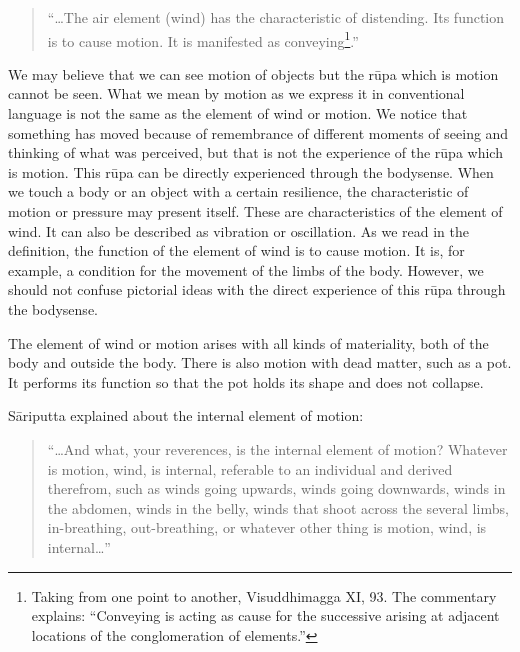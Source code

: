 \documentclass{book}
\begin{document}
\begin{quote}\begin{flushleft}
``\ldots The air element (wind) has the characteristic of distending. Its
function is to cause motion. It is manifested as
conveying\footnote{Taking from one point to another, Visuddhimagga
XI, 93. The commentary explains: ``Conveying is acting as cause for the
successive arising at adjacent locations of the conglomeration of
elements.''}.''
\end{flushleft}\end{quote}




We may believe that we can see motion of objects but the r\=upa which is
motion cannot be seen. What we mean by motion as we express it in
conventional language is not the same as the element of wind or motion.
We notice that something has moved because of remembrance of different
moments of seeing and thinking of what was perceived, but that is not
the experience of the r\=upa which is motion. This r\=upa can be
directly experienced through the bodysense. When we touch a body or an
object with a certain resilience, the characteristic of motion or
pressure may present itself. These are characteristics of the element
of wind. It can also be described as vibration or oscillation. As we
read in the definition, the function of the element of wind is to cause
motion. It is, for example, a condition for the movement of the limbs
of the body. However, we should not confuse pictorial ideas with the
direct experience of this r\=upa through the bodysense. 

The element of wind or motion arises with all kinds of materiality, both
of the body and outside the body. There is also motion with dead
matter, such as a pot. It performs its function so that the pot holds
its shape and does not collapse.

S{\=a}riputta explained about the internal element of motion:




\begin{quote}\begin{flushleft}
``\ldots And what, your reverences, is the internal element of motion?
Whatever is motion, wind, is internal, referable to an individual and
derived therefrom, such as winds going upwards, winds going downwards,
winds in the abdomen, winds in the belly, winds that shoot across the
several limbs, in-breathing, out-breathing, or whatever other thing
is motion, wind, is internal\ldots''
\end{flushleft}\end{quote}
\end{document}

